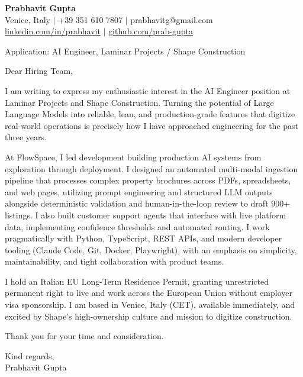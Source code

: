 \documentclass[a4paper,11pt]{article}
\begin{document}
\textbf{Prabhavit Gupta}\\
Venice, Italy $\vert$ +39 351 610 7807 $\vert$ prabhavitg@gmail.com\\
\href{https://www.linkedin.com/in/prabhavit/}{linkedin.com/in/prabhavit} $\vert$ \href{https://github.com/prab-gupta}{github.com/prab-gupta}

Application: AI Engineer, Laminar Projects / Shape Construction

Dear Hiring Team,

I am writing to express my enthusiastic interest in the AI Engineer position at Laminar Projects and Shape Construction. Turning the potential of Large Language Models into reliable, lean, and production-grade features that digitize real-world operations is precisely how I have approached engineering for the past three years.

At FlowSpace, I led development building production AI systems from exploration through deployment. I designed an automated multi-modal ingestion pipeline that processes complex property brochures across PDFs, spreadsheets, and web pages, utilizing prompt engineering and structured LLM outputs alongside deterministic validation and human-in-the-loop review to draft 900+ listings. I also built customer support agents that interface with live platform data, implementing confidence thresholds and automated routing. I work pragmatically with Python, TypeScript, REST APIs, and modern developer tooling (Claude Code, Git, Docker, Playwright), with an emphasis on simplicity, maintainability, and tight collaboration with product teams.

I hold an Italian EU Long-Term Residence Permit, granting unrestricted permanent right to live and work across the European Union without employer visa sponsorship. I am based in Venice, Italy (CET), available immediately, and excited by Shape's high-ownership culture and mission to digitize construction.

Thank you for your time and consideration.

Kind regards,\\
Prabhavit Gupta
\end{document}
